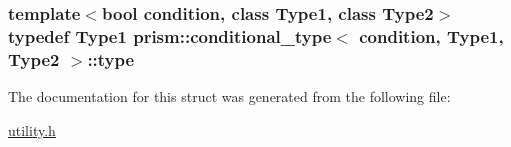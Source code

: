 \subsubsection[{\texorpdfstring{type}{type}}]{\setlength{\rightskip}{0pt plus 5cm}template$<$bool condition, class Type1, class Type2$>$ typedef Type1 {\bf prism\+::conditional\+\_\+type}$<$ condition, Type1, Type2 $>$\+::{\bf type}}\hypertarget{structprism_1_1conditional__type_a9d57ba7c29ee017e38e49bbb72229b7e}{}\label{structprism_1_1conditional__type_a9d57ba7c29ee017e38e49bbb72229b7e}


The documentation for this struct was generated from the following file\+:\begin{DoxyCompactItemize}
\item 
\hyperlink{utility_8h}{utility.\+h}\end{DoxyCompactItemize}
